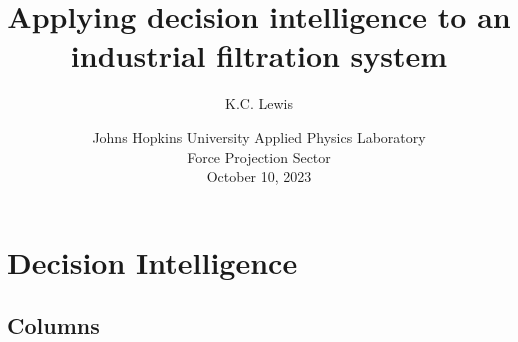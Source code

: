 \documentclass[
	11pt, %
]{beamer}
\title[Applying decision intelligence]{Applying decision intelligence to an industrial filtration system} %
\subtitle{} %
\author[K.C. Lewis]{K.C. Lewis} %
\date[\today]{Johns Hopkins University Applied Physics Laboratory\\ Force Projection Sector \\ October 10, 2023} %
\begin{document}

\begin{frame}
	\titlepage %
\end{frame}




\section{Decision Intelligence} %


\subsection{Columns}
\end{document}
